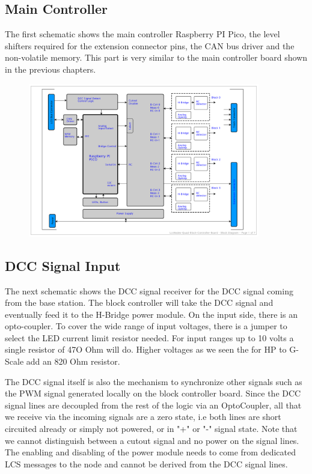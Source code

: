 \subsection{Main Controller}

The first schematic shows the main controller Raspberry PI Pico, the level shifters required for the extension connector pins, the CAN bus driver and the non-volatile memory. This part is very similar to the main controller board shown in the previous chapters.

\begin{figure}[htbp]
    \centering
    \includegraphics[page=2, width=0.9\textwidth]{./Schematics/Schematic_LcsNodes-Quad-Block-Controller.pdf}
\end{figure}
\FloatBarrier

\subsection{DCC Signal Input}

The next schematic shows the DCC signal receiver for the DCC signal coming from the base station. The block controller will take the DCC signal and eventually feed it to the H-Bridge power module. On the input side, there is an opto-coupler. To cover the wide range of input voltages, there is a jumper to select the LED current limit resistor needed. For input ranges up to 10 volts a single resistor of 47O Ohm will do. Higher voltages as we seen the for HP to G-Scale add an 820 Ohm resistor.  

The DCC signal itself is also the mechanism to synchronize other signals such as the PWM signal generated locally on the block controller board. Since the DCC signal lines are decoupled from the rest of the logic via an OptoCoupler, all that we receive via the incoming signals are a zero state, i.e both lines are short circuited already or simply not powered, or in "+" or "-" signal state. Note that we cannot distinguish between a cutout signal and no power on the signal lines. The enabling and disabling of the power module needs to come from dedicated LCS messages to the node and cannot be derived from the DCC signal lines.

